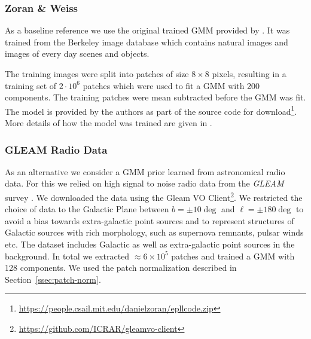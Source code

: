 \documentclass[twocolumn, linenumbers]{aastex631}
\begin{document}
    \subsubsection{Zoran \& Weiss}
    As a baseline reference we use the original trained GMM provided by \cite{Zoran2011}. It was trained from the Berkeley image database \citep{Martin2001} which contains natural images and images of every day scenes and objects. 
    
    The training images were split into patches of size $8\times8$ pixels, resulting in a training set of $2 \cdot 10^{6}$ patches which were used to fit a GMM with 200 components. The training patches were mean subtracted before the GMM was fit. The model is provided by the authors as part of the source code for download\footnote{\url{https://people.csail.mit.edu/danielzoran/epllcode.zip}}. More details of how the model was trained are given in \citet{Zoran2011}.
    
    \subsubsection{GLEAM Radio Data}
    \label{sssec:gleam-radio-data}
    As an alternative we consider a GMM prior learned from astronomical radio data. For this we relied on high signal to noise radio data from the \textit{GLEAM} survey \citep{HurleyWalker2022}. We downloaded the data using the Gleam VO Client\footnote{\url{https://github.com/ICRAR/gleamvo-client}}. We restricted the choice of data to the Galactic Plane between $b=\pm10\deg$ and $\ell = \pm180\deg$ to avoid a bias towards extra-galactic point sources and to represent structures of Galactic sources with rich morphology, such as supernova remnants, pulsar winds etc. The dataset includes Galactic as well as extra-galactic point sources in the background. In total we extracted $\approx 6 \times 10^5$ patches and trained a GMM with 128 components. We used the patch normalization described in Section~\ref{ssec:patch-norm}.
\end{document}
